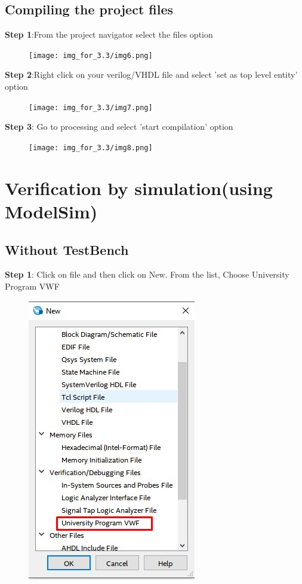 \documentclass[12pt,singleside,a4paper]{article}
\begin{document}

\subsection{Compiling the project files}
\noindent \textbf{Step 1}:From the project navigator select the files option
\begin{figure}[H]
\centering
\texttt{[image: img\_for\_3.3/img6.png]}
\end{figure}

\noindent \textbf{Step 2}:Right click on your verilog/VHDL file and select 'set as top level entity' option
\begin{figure}[H]
\centering
\texttt{[image: img\_for\_3.3/img7.png]}
\end{figure}

\noindent \textbf{Step 3}: Go to processing and select 'start compilation' option
\begin{figure}[H]
\centering
\texttt{[image: img\_for\_3.3/img8.png]}
\end{figure}






\section{Verification by simulation(using ModelSim)}
\subsection{Without TestBench}
\noindent \textbf{Step 1}: Click on file and then click on New. From the list, Choose University Program VWF
\begin{figure}[H]
\centering
\includegraphics[scale=0.7]{Simulation_without_tb/first.jpg}
\end{figure}
\end{document}

